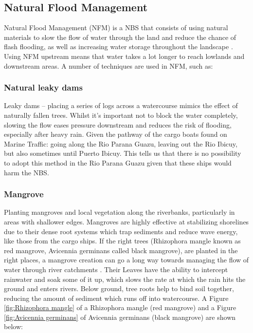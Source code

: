 \subsection{Natural Flood Management}
Natural Flood Management (NFM) is a NBS that consists of using natural materials to slow the flow of water through the land and reduce the chance of flash flooding, as well as increasing water storage throughout the landscape \autocite{therivertrust5EasyWays}. Using NFM upstream means that water takes a lot longer to reach lowlands and downstream areas. 
A number of techniques are used in NFM, such as:

\subsubsection{Natural leaky dams}
Leaky dams – placing a series of logs across a watercourse mimics the effect of naturally fallen trees. Whilst it’s important not to block the water completely, slowing the flow eases pressure downstream and reduces the risk of flooding, especially after heavy rain. Given the pathway of the cargo boats found on Marine Traffic: going along the Rio Parana Guazu, leaving out the Rio Ibicuy, but also sometimes until Puerto Ibicuy. This tells us that there is no possibility to adopt this method in the Rio Parana Guazu given that these ships would harm the NBS.

\subsubsection{Mangrove}

Planting mangroves and local vegetation along the riverbanks, particularly in areas with shallower edges. Mangroves are highly effective at stabilizing shorelines due to their dense root systems which trap sediments and reduce wave energy, like those from the cargo ships. If the right trees (Rhizophora mangle known as red mangrove, Avicennia germinans called black mangrove), are planted in the right places, a mangrove creation can go a long way towards managing the flow of water through river catchments \autocite{ferreiraPropagulosMangueVermelho2024}.
Their Leaves have the ability to intercept rainwater and soak some of it up, which slows the rate at which the rain hits the ground and enters rivers. Below ground, tree roots help to bind soil together, reducing the amount of sediment which runs off into watercourse. A Figure \ref{fig:Rhizophora mangle} of a Rhizophora mangle (red mangrove) and a Figure \ref{fig:Avicennia germinans} of Avicennia germinans (black mangrove) are shown below:

